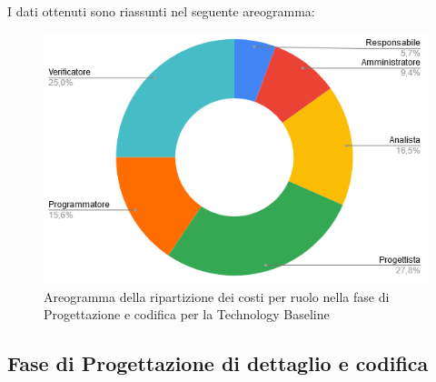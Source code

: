 I dati ottenuti sono riassunti nel seguente areogramma:
\begin{figure}[H]
\centering
\includegraphics[scale=0.60]{img/grafici/torta_fase_prog_architetturale.png}
\caption{Areogramma della ripartizione dei costi per ruolo nella fase di Progettazione e codifica per la Technology Baseline}
\end{figure}
 
 
\subsection{Fase di Progettazione di dettaglio e codifica}
